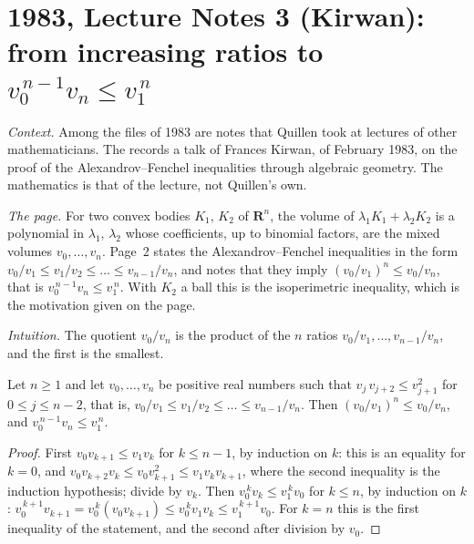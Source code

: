 \section[1983, Lecture Notes 3 (Kirwan): from increasing ratios to $v_0^{n-1}v_n \le v_1^n$]{1983, Lecture Notes 3 (Kirwan): from increasing ratios to $v_0^{\,n-1}v_n \le v_1^{\,n}$\protect{}}\label{sec:quillen-1983-ln3}

\emph{Context.} Among the files of 1983 are notes that Quillen took at lectures of other mathematicians. The  records a talk of Frances Kirwan, of February 1983, on the proof of the Alexandrov--Fenchel inequalities through algebraic geometry. The mathematics is that of the lecture, not Quillen's own.

\emph{The page.} For two convex bodies $K_1$, $K_2$ of $\mathbf R^n$, the volume of $\lambda_1K_1 + \lambda_2K_2$ is a polynomial in $\lambda_1$, $\lambda_2$ whose coefficients, up to binomial factors, are the mixed volumes $v_0, \dots, v_n$. Page~2 states the Alexandrov--Fenchel inequalities in the form $v_0/v_1 \le v_1/v_2 \le \dots \le v_{n-1}/v_n$, and notes that they imply $(v_0/v_1)^n \le v_0/v_n$, that is $v_0^{\,n-1}v_n \le v_1^{\,n}$. With $K_2$ a ball this is the isoperimetric inequality, which is the motivation given on the page.

\emph{Intuition.} The quotient $v_0/v_n$ is the product of the $n$ ratios $v_0/v_1, \dots, v_{n-1}/v_n$, and the first is the smallest.

\begin{encadre}
\begin{theoreme}\label{thm:quillen-1983-ln3}
Let $n \ge 1$ and let $v_0, \dots, v_n$ be positive real numbers such that $v_j\,v_{j+2} \le v_{j+1}^2$ for $0 \le j \le n - 2$, that is, $v_0/v_1 \le v_1/v_2 \le \dots \le v_{n-1}/v_n$. Then $(v_0/v_1)^n \le v_0/v_n$, and $v_0^{\,n-1}v_n \le v_1^{\,n}$.
\end{theoreme}
\end{encadre}

\begin{proof}
First $v_0v_{k+1} \le v_1v_k$ for $k \le n - 1$, by induction on $k$: this is an equality for $k = 0$, and $v_0v_{k+2}v_k \le v_0v_{k+1}^2 \le v_1v_kv_{k+1}$, where the second inequality is the induction hypothesis; divide by $v_k$. Then $v_0^{\,k}v_k \le v_1^{\,k}v_0$ for $k \le n$, by induction on $k$: $v_0^{\,k+1}v_{k+1} = v_0^{\,k}(v_0v_{k+1}) \le v_0^{\,k}v_1v_k \le v_1^{\,k+1}v_0$. For $k = n$ this is the first inequality of the statement, and the second after division by $v_0$.
\end{proof}

